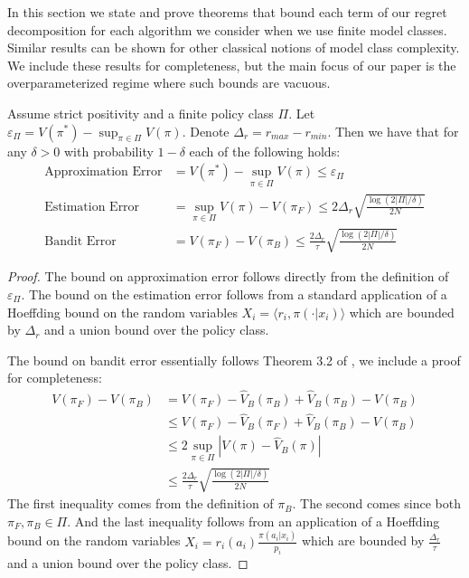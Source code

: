 \begin{subappendices}
\label{app:small}


In this section we state and prove theorems that bound each term of our regret decomposition for each algorithm we consider when we use finite model classes. Similar results can be shown for other classical notions of model class complexity. We include these results for completeness, but the main focus of our paper is the overparameterized regime where such bounds are vacuous.


\begin{theorem}\label{thm:pol-small}
Assume strict positivity and a finite policy class $ \Pi$. Let $ \varepsilon_\Pi = V(\pi^*) - \sup_{\pi \in \Pi} V(\pi)$. Denote $ \Delta_r = r_{max} - r_{min}$. Then we have that for any $ \delta > 0$ with probability $ 1- \delta$ each of the following holds:
\begin{align*}
    \text{Approximation Error} &= V(\pi^*) - \sup_{\pi\in \Pi}V(\pi) \leq \varepsilon_\Pi\\
    \text{Estimation Error}  &= \sup_{\pi\in \Pi}V(\pi) - V(\pi_F) \leq 2\Delta_r \sqrt{\frac{\log(2|\Pi|/\delta)}{2N}}\\
    \text{Bandit Error}  &= V(\pi_F) - V(\pi_B) \leq \frac{2\Delta_r}{\tau} \sqrt{\frac{\log(2|\Pi|/\delta)}{2N}}
\end{align*}
\end{theorem}
\begin{proof}
The bound on approximation error follows directly from the definition of $ \varepsilon_\Pi$. The bound on the estimation error follows from a standard application of a Hoeffding bound on the random variables $ X_i = \langle r_i, \pi(\cdot|x_i)\rangle
$ which are bounded by $ \Delta_r$ and a union bound over the policy class.

The bound on bandit error essentially follows Theorem 3.2 of \cite{strehl2010learning}, we include a proof for completeness:
\begin{align*}
    V(\pi_F) - V(\pi_B) &= V(\pi_F) - \hat V_B(\pi_B) + \hat V_B(\pi_B) - V(\pi_B) \\
    &\leq V(\pi_F) - \hat V_B(\pi_F) + \hat V_B(\pi_B) - V(\pi_B)\\
    &\leq 2 \sup_{\pi \in \Pi} |V(\pi) - \hat V_B(\pi)|\\
    &\leq \frac{2\Delta_r}{\tau} \sqrt{\frac{\log(2|\Pi|/\delta)}{2N}}
\end{align*}
The first inequality comes from the definition of $ \pi_B$. The second comes since both $ \pi_F, \pi_B \in \Pi$.
And the last inequality follows from an application of a Hoeffding bound on the random variables $ X_i = r_i(a_i)\frac{\pi(a_i|x_i)}{p_i}$ which are bounded by $ \frac{\Delta_r}{\tau}$ and a union bound over the policy class.
\end{proof}


\end{subappendices}
